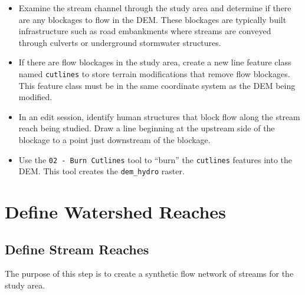 \documentclass[]{book}
\providecommand{\tightlist}{%
  \setlength{\itemsep}{0pt}\setlength{\parskip}{0pt}}
\theoremstyle{definition}
\theoremstyle{definition}
\theoremstyle{definition}
\theoremstyle{remark}
\begin{document}
\begin{itemize}
\tightlist
\item
  Examine the stream channel through the study area and determine if
  there are any blockages to flow in the DEM. These blockages are
  typically built infrastructure such as road embankments where streams
  are conveyed through culverts or underground stormwater structures.
\item
  If there are flow blockages in the study area, create a new line
  feature class named \texttt{cutlines} to store terrain modifications
  that remove flow blockages. This feature class must be in the same
  coordinate system as the DEM being modified.
\item
  In an edit session, identify human structures that block flow along
  the stream reach being studied. Draw a line beginning at the upstream
  side of the blockage to a point just downstream of the blockage.
\item
  Use the \texttt{02\ -\ Burn\ Cutlines} tool to ``burn'' the
  \texttt{cutlines} features into the DEM. This tool creates the
  \texttt{dem\_hydro} raster.
\end{itemize}

\section{Define Watershed Reaches}\label{define-watershed-reaches-1}

\subsection{Define Stream Reaches}\label{define-stream-reaches}

The purpose of this step is to create a synthetic flow network of
streams for the study area.
\end{document}
